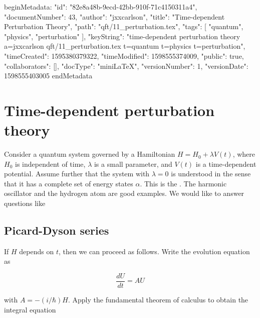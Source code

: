 beginMetadata:
{
    "id": "82e8a48b-9ecd-42bb-910f-71c4150311a4",
    "documentNumber": 43,
    "author": "jxxcarlson",
    "title": "Time-dependent Perturbation Theory",
    "path": "qft/11_perturbation.tex",
    "tags": [
        "quantum",
        "physics",
        "perturbation"
    ],
    "keyString": "time-dependent perturbation theory a=jxxcarlson qft/11_perturbation.tex t=quantum t=physics t=perturbation",
    "timeCreated": 1595380379322,
    "timeModified": 1598555374009,
    "public": true,
    "collaborators": [],
    "docType": "miniLaTeX",
    "versionNumber": 1,
    "versionDate": 1598555403005
}
endMetadata
\begin{mathmacro}
\newcommand{\bra}[0]{\langle}
\newcommand{\ket}[0]{\rangle}
\newcommand{\caF}[0]{\mathcal{F}}
\newcommand{\caA}[0]{\mathcal{A}}
\newcommand{\boR}[0]{\bf{R}}
\newcommand{\sett}[2]{\{#1\ |\ #2 \}}
\newcommand{\set}[1]{\{#1\}}
\end{mathmacro}

\setcounter{section}{11}


\section{Time-dependent perturbation theory}

\innertableofcontents

Consider a quantum system governed by a Hamiltonian $H = H_0 + \lambda V(t)$, where $H_0$ is independent of time, $\lambda$ is a small parameter, and $V(t)$ is a time-dependent potential.  Assume further that the system with $\lambda = 0$ is understood in the sense that it has a complete set of energy states $\alpha$.  This is the . The harmonic oscillator and the hydrogen atom are good examples.  We would like to answer questions like    

\subsection{Picard-Dyson series}

If $H$ depends on $t$, then we can proceed as follows. 
Write the  evolution equation as

\begin{equation}
\frac{dU}{dt} =AU
\end{equation}

with $A = -(i/\hbar)H$.  Apply the  fundamental theorem of calculus to obtain the integral equation

